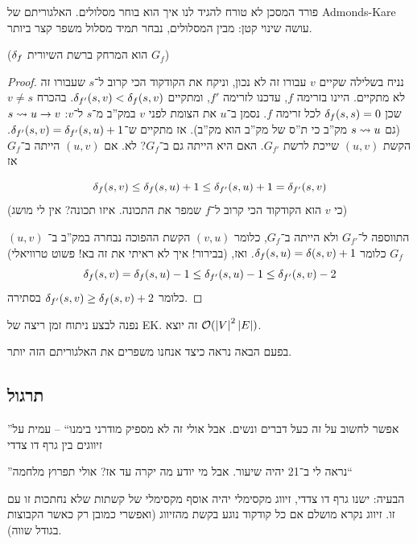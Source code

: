 \documentclass[]{../../../../tex/classes/styledArticle}
\begin{document}
	פורד המסכן לא טורח להגיד לנו איך הוא בוחר מסלולים. האלגוריתם של Admonds-Kare עושה שינוי קטן: מבין המסלולים, נבחר תמיד מסלול משפר קצר ביותר. 
	
	($\delta_f$ הוא המרחק ברשת השיורית $G_f$)
	\begin{proof}
		נניח בשלילה שקיים $v$ עבורו זה לא נכון, וניקח את הקודקוד הכי קרוב ל־$s$ שעבורו זה לא מתקיים. היינו בזרימה $f$, עדכנו לזרימה $f'$, ומתקיים $\delta_{f'}(s, v) < \delta_f(s, v)$. בהכרח $v \neq s$ שכן $\delta_f(s, s) = 0$ לכל זרימה $f$. נסמן ב־$u$ את הצומת לפני $v$ במק''ב מ־$s$ ל־$v$: $s \rightsquigarrow u \to v$ (גם $s \rightsquigarrow u$ מק''ב כי ת''ס של מק''ב הוא מק''ב). אז מתקיים ש־$\delta_{f'}(s, v) = \delta_{f'}(s, u) + 1$. הקשת $(u, v)$ שייכת לרשת $G_{f'}$. האם היא הייתה גם ב־$G_f$? לא. אם $(u, v)$ הייתה ב־$G_f$ אז
		 
		 \[ \delta_f(s, v) \le \delta_f(s, u) + 1 \le \delta_{f'}(s, u) + 1 = \delta_{f'}(s, v) \]
		  (כי $v$ הוא הקודקוד הכי קרוב ל־$f$ שמפר את התכונה. איזו תכונה? אין לי מושג)
		  
		  $(u, v)$ התווספה ל־$G_{f'}$ ולא הייתה ב־$G_f$, כלומר $(v, u)$ הקשת ההפוכה נבחרה במק''ב ב־$G_f$ כלומר $\delta_f(s, u) = \delta(s, v) + 1$. ואז, (בבירור! איך לא ראיתי את זה בא! פשוט טרוויאלי) 
		  \[ \delta_f(s, v) = \delta_f(s, u) - 1 \le \delta_{f'}(s, u) - 1 \le \delta_{f'}(s, v) - 2 \]
		  כלומר $\delta_{f'}(s, v) \ge \delta_f(s, v) + 2$ בסתירה. 
	\end{proof}
	
	נפנה לבצע ניתוח זמן ריצה של EK. זה יוצא $\mathcal{O}(\left \lvert V \right \rvert^{2} \left \lvert E \right \rvert)$. 
	
	בפעם הבאה נראה כיצד אנחנו משפרים את האלגוריתם הזה יותר. 
	
	
	\subsection*{תרגול}
	''אפשר לחשוב על זה כעל דברים ונשים. אבל אולי זה לא מספיק מודרני בימנו`` – עמית על זיווגים בין גרף דו צדדי
	
	''נראה לי ב־21 יהיה שיעור. אבל מי יודע מה יקרה עד אז? אולי תפרוץ מלחמה``
	
	הבעיה: ישנו גרף דו צדדי, זיווג מקסימלי יהיה אוסף מקסימלי של קשתות שלא נחתכות זו עם זו. זיווג נקרא מושלם אם כל קודקוד נוגע בקשת מהזיווג (ואפשרי כמובן רק כאשר הקבוצות בגודל שווה). 
	
\end{document}
